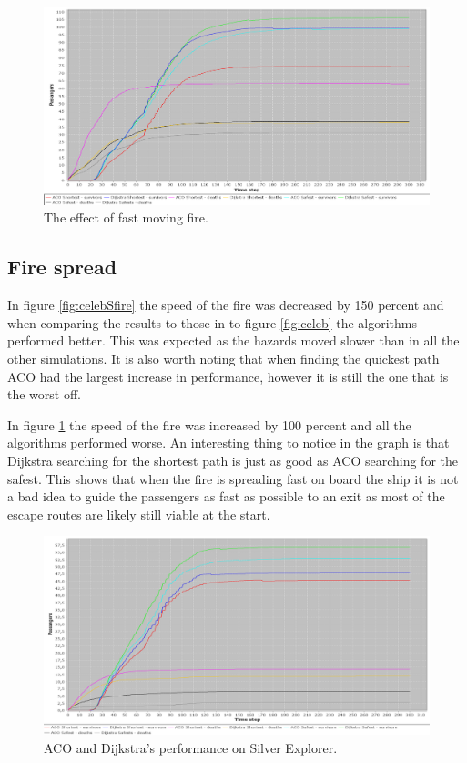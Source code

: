 \begin{figure} [h]
\centering
\hspace*{-1.0in}
\includegraphics[scale=0.35]{images/Graph-using-200-rounds-140-passangers-and-fast-fire.png}
\caption{The effect of fast moving fire.}
\label{fig:celebFfire}
\end{figure}

\subsection{Fire spread}

In figure \ref{fig:celebSfire} the speed of the fire was decreased by 150 percent and when comparing the results to those in to figure \ref{fig:celeb} the algorithms performed better. This was expected as the hazards moved slower than in all the other simulations. It is also worth noting that when finding the quickest path ACO had the largest increase in performance, however it is still the one that is the worst off.

In figure \ref{fig:celebFfire} the speed of the fire was increased by 100 percent and all the algorithms performed worse. An interesting thing to notice in the graph is that Dijkstra searching for the shortest path is just as good as ACO searching for the safest. This shows that when the fire is spreading fast on board the ship it is not a bad idea to guide the passengers as fast as possible to an exit  as most of the escape routes are likely still viable at the start.

\begin{figure} [h]
\centering
\hspace*{-1.0in}
\includegraphics[scale=0.35]{images/Graph-ship-two-60-passangers-200-rounds.png}
\caption{ACO and Dijkstra's performance on Silver Explorer.}
\label{fig:silverExplor}
\end{figure}

